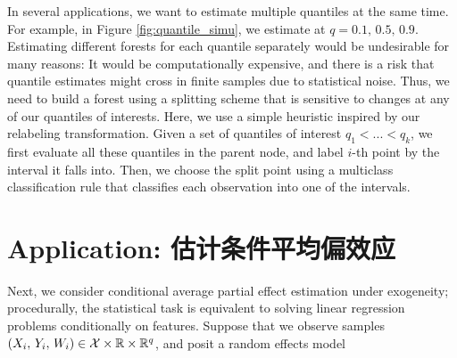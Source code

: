 \documentclass[aos]{imsart}
\theoremstyle{plain}
\theoremstyle{definition}
\theoremstyle{remark}
\begin{document}
\begin{CJK}{UTF8}{gbsn}
In several applications, we want to estimate multiple quantiles
at the same time. For example, in Figure \ref{fig:quantile_simu}, we estimate at $q = 0.1, \, 0.5, \, 0.9$.
Estimating different forests for each quantile separately would be undesirable
for many reasons: It would be computationally expensive, and there is a risk that quantile
estimates might cross in finite samples due to statistical noise. Thus, we need to build a forest using
a splitting scheme that is sensitive to changes at any of our quantiles of interests.
Here, we use a simple heuristic inspired by our relabeling transformation.
Given a set of quantiles of interest $q_1 < ... < q_k$, we first evaluate all these quantiles
  in the parent node, and label $i$-th point by the
interval \smash{$[\htheta_{q_{j - 1}, P(X_i)}, \, \htheta_{q_{j}, P(X_i)})$} it falls into. Then, we choose the
split point using a multiclass classification rule that classifies each observation into one of the intervals.


\section{Application: 估计条件平均偏效应}
\label{sec:cape}

Next, we consider conditional average partial effect estimation under
exogeneity; procedurally, the statistical task is equivalent to solving linear regression problems conditionally on features. Suppose that we observe samples $(X_i, \, Y_i, \, W_i) \in \mathcal{X} \times \mathbb{R} \times \mathbb{R}^q$, and posit a random effects model 


\end{CJK}
\end{document}
